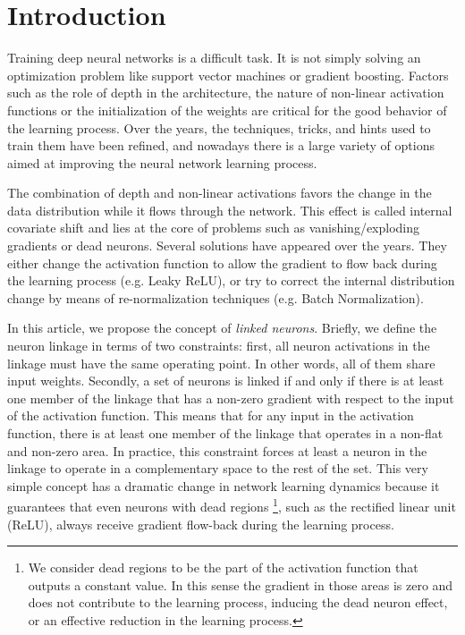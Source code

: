 \documentclass[10pt,twocolumn,letterpaper]{article}
\begin{document}
\section{Introduction}

Training deep neural networks is a difficult task. It is not simply solving an optimization problem like support vector machines or gradient boosting. Factors such as the role of depth in the architecture, the nature of non-linear activation functions or the initialization of the weights are critical for the good behavior of the learning process. Over the years, the techniques, tricks, and hints used to train them have been refined, and nowadays there is a large variety of options aimed at improving the neural network learning process. 

The combination of depth and non-linear activations favors the change in the data distribution while it flows through the network. This effect is called internal covariate shift \cite{batchnorm} and lies at the core of problems such as vanishing/exploding gradients or dead neurons. Several solutions have appeared over the years. They either change the activation function to allow the gradient to flow back during the learning process (e.g. Leaky ReLU), or try to correct the internal distribution change by means of re-normalization techniques (e.g. Batch Normalization).

In this article, we propose the concept of {\it linked neurons}. Briefly, we define the neuron linkage in terms of two constraints: first, all neuron activations in the linkage must have the same operating point. In other words, all of them share input weights. Secondly, a set of neurons is linked if and only if there is at least one member of the linkage that has a non-zero gradient with respect to the input of the activation function. This means that for any input in the activation function, there is at least one member of the linkage that operates in a non-flat and non-zero area. In practice, this constraint forces at least a neuron in the linkage to operate in a complementary space to the rest of the set. This very simple concept has a dramatic change in network learning dynamics because it guarantees that even neurons with dead regions \footnote{We consider dead regions to be the part of the activation function that outputs a constant value. In this sense the gradient in those areas is zero and does not contribute to the learning process, inducing the dead neuron effect, or an effective reduction in the learning process.}, such as the rectified linear unit (ReLU), always receive gradient flow-back during the learning process. 
\end{document}
